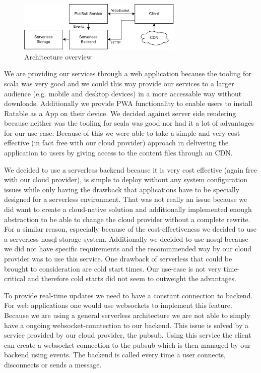 \documentclass[
	ngerman,
	ruledheaders=section,   %
	class=report,		    %
	thesis={type=bachelor}, %
	accentcolor=9c,			%
	custommargins=true,    %
	marginpar=false,        %
	parskip=half-,          %
	fontsize=11pt,          %
]{tudapub}
\begin{document}
\begin{figure}[h]
  \centering
  \includegraphics[width=0.7\textwidth]{architecture_services.png}
  \caption{Architecture overview}
\end{figure}


We are providing our services through a web application because the tooling for scala was very good and we could this way provide our services to a larger audience (e.g. mobile and desktop devices) in a more accessable way without downloads. Additionally we provide PWA functionality to enable users to install Ratable as a App on their device. We decided against server side rendering because neither was the tooling for scala was good nor had it a lot of advantages for our use case. Because of this we were able to take a simple and very cost effective (in fact free with our cloud provider) approach in delivering the application to users by giving access to the content files through an CDN. 

We decided to use a serverless backend because it is very cost effective (again free with our cloud provider), is simple to deploy without any system configuration issues while only having the drawback that applications have to be specially designed for a serverless environment. That was not really an issue because we did want to create a cloud-native solution and additionally implemented enough abstraction to be able to change the cloud provider without a complete rewrite. For a similar reason, especially because of the cost-effectiveness we decided to use a serverless nosql storage system. Additionally we decided to use nosql because we did not have specific requirements and the recommmended way by our cloud provider was to use this service. One drawback of serverless that could be brought to consideration are cold start times. Our use-case is not very time-critical and therefore cold starts did not seem to outweight the advantages.

To provide real-time updates we need to have a constant connection to backend. For web applications one would use websockets to implement this feature. Because we are using a general serverless architecture we are not able to simply have a ongoing websocket-conntection to our backend. This issue is solved by a service provided by our cloud provider, the pubsub. Using this service the client can create a websocket connection to the pubsub which is then managed by our backend using events. The backend is called every time a user connects, disconnects or sends a message.
\end{document}

